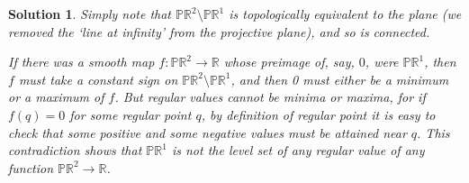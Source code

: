 \documentclass{article}
\theoremstyle{nonumberplain}
\newtheorem{sol}{Solution}
\newcommand{\R}{\mathbb{R}}
\newcommand{\PP}{\mathbb{P}}
\begin{document}
\begin{sol}
Simply note that $\PP\R^2 \setminus \PP\R^1$ is topologically equivalent to the plane (we removed the `line at infinity' from the projective plane), and so is connected.

If there was a smooth map $f \colon \PP\R^2 \to \R$ whose preimage of, say, $0$, were $\PP\R^1$, then $f$ must take a constant sign on $\PP\R^2 \setminus \PP\R^1$, and then 0 must either be a minimum or a maximum of $f$. But regular values cannot be minima or maxima, for if $f(q) = 0$ for some regular point $q$, by definition of regular point it is easy to check that some positive and some negative values must be attained near $q$. This contradiction shows that $\PP\R^1$ is not the level set of any regular value of any function $\PP\R^2 \to \R$.
\end{sol}
\end{document}
